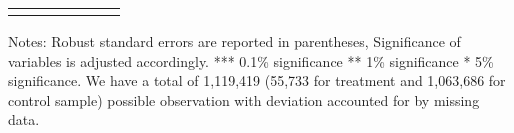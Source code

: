\begin{sidewaystable}[!htbp]
{\begin{threeparttable}
\begin{tabular}{@{\extracolsep{5pt}}lD{.}{.}{-3} D{.}{.}{-3} D{.}{.}{-3} D{.}{.}{-3} D{.}{.}{-3} D{.}{.}{-3} }

\bottomrule \\[-1.8ex] 
\end{tabular}

 \begin{tablenotes}
  \LARGE
      Notes: Robust standard errors are reported in parentheses, Significance of variables is adjusted accordingly. *** 0.1\% significance ** 1\% significance * 5\% significance. We have a total of 1,119,419 (55,733 for treatment and 1,063,686 for control sample) possible observation with deviation accounted for by missing data.
\end{tablenotes}    

    \end{threeparttable}


}
\end{sidewaystable} 